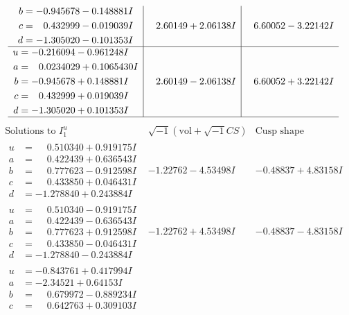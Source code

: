 \documentclass[1p]{elsarticle_modified}
\theoremstyle{definition}
\newcommand{\I}{\sqrt{-1}}
\begin{document}
$$\begin{array}{c|c|c}
\begin{aligned}
b &= -0.945678 - 0.148881 I \\
c &= \phantom{-}0.432999 - 0.019039 I \\
d &= -1.305020 - 0.101353 I\end{aligned}
 & \phantom{-}2.60149 + 2.06138 I & \phantom{-}6.60052 - 3.22142 I \\ \hline\begin{aligned}
u &= -0.216094 - 0.961248 I \\
a &= \phantom{-}0.0234029 + 0.1065430 I \\
b &= -0.945678 + 0.148881 I \\
c &= \phantom{-}0.432999 + 0.019039 I \\
d &= -1.305020 + 0.101353 I\end{aligned}
 & \phantom{-}2.60149 - 2.06138 I & \phantom{-}6.60052 + 3.22142 I\\
 \hline 
 \end{array}$$\newpage$$\begin{array}{c|c|c}  
\text{Solutions to }I^u_{1}& \I (\text{vol} + \sqrt{-1}CS) & \text{Cusp shape}\\
 \hline 
\begin{aligned}
u &= \phantom{-}0.510340 + 0.919175 I \\
a &= \phantom{-}0.422439 + 0.636543 I \\
b &= \phantom{-}0.777623 - 0.912598 I \\
c &= \phantom{-}0.433850 + 0.046431 I \\
d &= -1.278840 + 0.243884 I\end{aligned}
 & -1.22762 - 4.53498 I & -0.48837 + 4.83158 I \\ \hline\begin{aligned}
u &= \phantom{-}0.510340 - 0.919175 I \\
a &= \phantom{-}0.422439 - 0.636543 I \\
b &= \phantom{-}0.777623 + 0.912598 I \\
c &= \phantom{-}0.433850 - 0.046431 I \\
d &= -1.278840 - 0.243884 I\end{aligned}
 & -1.22762 + 4.53498 I & -0.48837 - 4.83158 I \\ \hline\begin{aligned}
u &= -0.843761 + 0.417994 I \\
a &= -2.34521 + 0.64153 I \\
b &= \phantom{-}0.679972 - 0.889234 I \\
c &= \phantom{-}0.642763 + 0.309103 I \\

\end{aligned}
\end{array}$$
\end{document}
